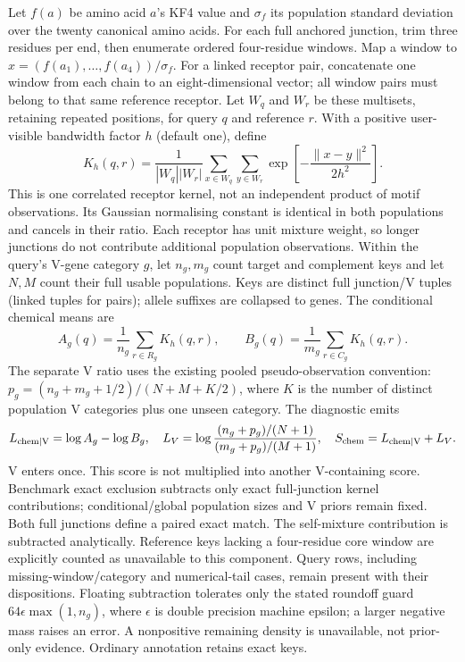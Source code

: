 \documentclass[10pt,a4paper]{article}
\theoremstyle{definition}
\begin{document}
Let $f(a)$ be amino acid $a$'s KF4 value and $\sigma_f$ its population standard
deviation over the twenty canonical amino acids. For each full anchored junction,
trim three residues per end, then enumerate ordered four-residue windows.
Map a window to $x=(f(a_1),\ldots,f(a_4))/\sigma_f$. For a linked receptor pair,
concatenate one window from each chain to an eight-dimensional vector; all
window pairs must belong to that same reference receptor. Let $W_q$ and $W_r$
be these multisets, retaining repeated positions, for query $q$ and reference $r$.
With a positive user-visible bandwidth factor $h$ (default one), define
\[
 K_h(q,r)=\frac{1}{|W_q||W_r|}
 \sum_{x\in W_q}\sum_{y\in W_r}
 \exp\!\left[-\frac{\|x-y\|^2}{2h^2}\right].
\]
This is one correlated receptor kernel, not an independent product of motif
observations. Its Gaussian normalising constant is identical in both populations
and cancels in their ratio. Each receptor has unit mixture weight, so longer
junctions do not contribute additional population observations. Within the
query's V-gene category $g$, let $n_g,m_g$ count target and complement keys and
let $N,M$ count their full usable populations. Keys are distinct full junction/V
tuples (linked tuples for pairs); allele suffixes are collapsed to genes.
The conditional chemical means are
\[
 A_g(q)=\frac{1}{n_g}\sum_{r\in R_g}K_h(q,r),\qquad
 B_g(q)=\frac{1}{m_g}\sum_{r\in C_g}K_h(q,r).
\]
The separate V ratio uses the existing pooled pseudo-observation convention:
$p_g=(n_g+m_g+1/2)/(N+M+K/2)$, where $K$ is the number of distinct population
V categories plus one unseen category. The diagnostic emits
\[
 L_{\rm chem\mid V}=\log A_g-\log B_g,\quad
 L_V=\log\frac{(n_g+p_g)/(N+1)}{(m_g+p_g)/(M+1)},\quad
 S_{\rm chem}=L_{\rm chem\mid V}+L_V.
\]
V enters once. This score is not multiplied into another V-containing score.
Benchmark exact exclusion subtracts only exact full-junction kernel contributions;
conditional/global population sizes and V priors remain fixed. Both full junctions
define a paired exact match. The self-mixture contribution is subtracted analytically.
Reference keys lacking a four-residue core window are explicitly counted as
unavailable to this component. Query rows, including missing-window/category
and numerical-tail cases, remain present with their dispositions. Floating
subtraction tolerates only the stated roundoff guard $64\epsilon\max(1,n_g)$,
where $\epsilon$ is double precision machine epsilon; a larger negative mass
raises an error. A nonpositive remaining density is unavailable, not prior-only
evidence. Ordinary annotation retains exact keys.
\end{document}
